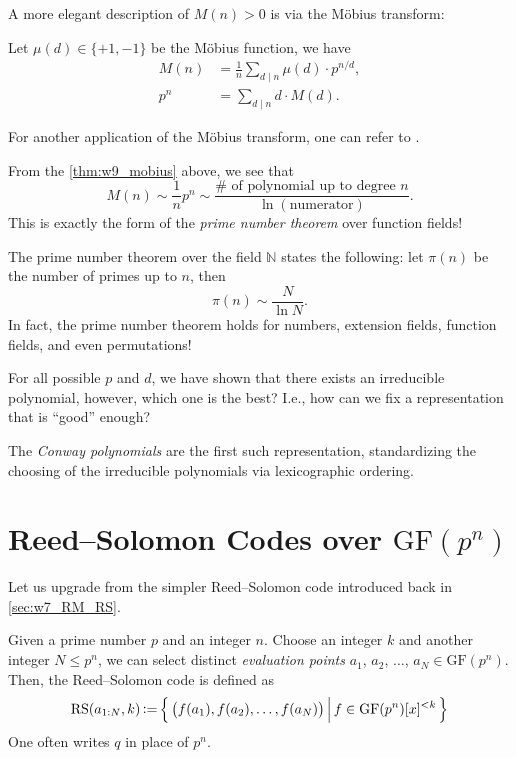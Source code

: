 A more elegant description of $M(n)>0$ is via the M\"obius transform:
\begin{theorem} \label{thm:w9_mobius}
    Let $\mu(d)\in\{+1,-1\}$ be the M\"obius function, we have
    \begin{align}
        M(n) &= \frac{1}{n} \sum_{d\mid n} \mu(d) \cdot p^{n/d}, \\
        p^{n} &= \sum_{d\mid n} d \cdot M(d).
    \end{align}
\end{theorem}

For another application of the M\"obius transform, one can refer to .

\begin{remark}
    From the \autoref{thm:w9_mobius} above, we see that
    \begin{equation}
        M(n) \sim \frac{1}{n} p^n \sim \frac{\#\text{ of polynomial up to degree }n}{\ln(\text{numerator})}.
    \end{equation}
    This is exactly the form of the \textit{prime number theorem} over function fields!

    The prime number theorem over the field $\mathbb{N}$ states the following: let $\pi(n)$ be the number of primes up to $n$, then
    \begin{equation}
        \pi(n) \sim \frac{N}{\ln N}.
    \end{equation}
    In fact, the prime number theorem holds for numbers, extension fields, function fields, and even permutations!
\end{remark}

\begin{remark}
    For all possible $p$ and $d$, we have shown that there exists an irreducible polynomial, however, which one is the best? I.e., how can we fix a representation that is ``good'' enough?

    The \textit{Conway polynomials} are the first such representation, standardizing the choosing of the irreducible polynomials via lexicographic ordering.
\end{remark}



\section{Reed--Solomon Codes over $\mathrm{GF}(p^n)$}
Let us upgrade from the simpler Reed--Solomon code introduced back in \autoref{sec:w7_RM_RS}.

\begin{definition}
    Given a prime number $p$ and an integer $n$. Choose an integer $k$ and another integer $N \le p^n$, we can select distinct \textit{evaluation points} $a_1$, $a_2$, $\ldots$, $a_N\in\mathrm{GF}(p^n)$. Then, the Reed--Solomon code is defined as
    \begin{equation}
        \mathrm{RS}(a_{1:N},k) \operatorname{\vcentcolon=} \left\{\,{\left(f(a_1),f(a_2),\ldots,f(a_N)\right)}\,\middle\vert\,{f\in\mathrm{GF}(p^n)[x]^{<k}}\,\right\}
    \end{equation}
    One often writes $q$ in place of $p^n$.
\end{definition}

